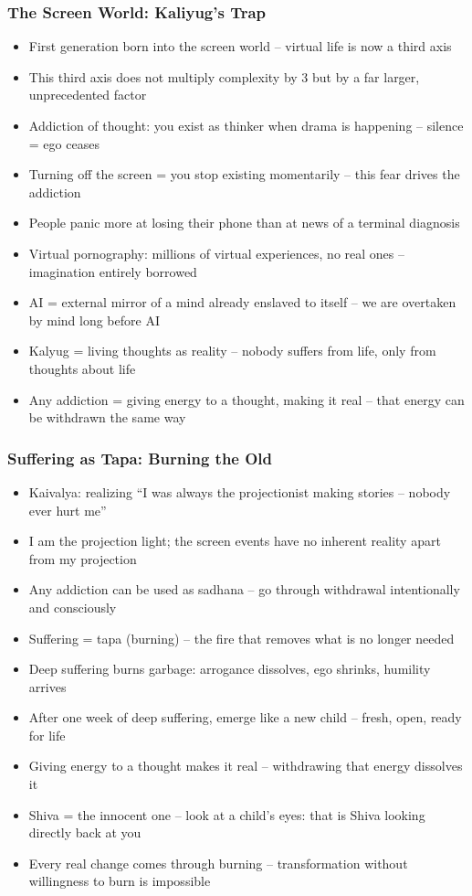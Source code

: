 \begin{frame}[fragile]\frametitle{The Screen World: Kaliyug's Trap}
  \begin{itemize}
    \item First generation born into the screen world -- virtual life is now a third axis
    \item This third axis does not multiply complexity by 3 but by a far larger, unprecedented factor
    \item Addiction of thought: you exist as thinker when drama is happening -- silence = ego ceases
    \item Turning off the screen = you stop existing momentarily -- this fear drives the addiction
    \item People panic more at losing their phone than at news of a terminal diagnosis
    \item Virtual pornography: millions of virtual experiences, no real ones -- imagination entirely borrowed
    \item AI = external mirror of a mind already enslaved to itself -- we are overtaken by mind long before AI
    \item Kalyug = living thoughts as reality -- nobody suffers from life, only from thoughts about life
    \item Any addiction = giving energy to a thought, making it real -- that energy can be withdrawn the same way
  \end{itemize}
\end{frame}

\begin{frame}[fragile]\frametitle{Suffering as Tapa: Burning the Old}
  \begin{itemize}
    \item Kaivalya: realizing ``I was always the projectionist making stories -- nobody ever hurt me''
    \item I am the projection light; the screen events have no inherent reality apart from my projection
    \item Any addiction can be used as sadhana -- go through withdrawal intentionally and consciously
    \item Suffering = tapa (burning) -- the fire that removes what is no longer needed
    \item Deep suffering burns garbage: arrogance dissolves, ego shrinks, humility arrives
    \item After one week of deep suffering, emerge like a new child -- fresh, open, ready for life
    \item Giving energy to a thought makes it real -- withdrawing that energy dissolves it
    \item Shiva = the innocent one -- look at a child's eyes: that is Shiva looking directly back at you
    \item Every real change comes through burning -- transformation without willingness to burn is impossible
  \end{itemize}
\end{frame}

